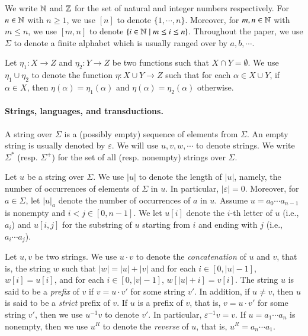 
We write $\mathbb{N}$ and $\mathbb{Z}$ for the set of natural and integer numbers respectively. For $n \in \mathbb{N}$ with $n \ge 1$, we use $[n]$ to denote $\{1, \cdots, n\}$. Moreover, for $m,n \in \mathbb{N}$ with $m \le n$, we use $[m, n]$ to denote $\{ i \in \mathbb{N} \mid m \le i \le n \}$. Throughout the paper, we use $\Sigma$ to denote a finite alphabet which is usually ranged over by $a,b,\cdots$.

Let $\eta_1: X \rightarrow Z$ and $\eta_2: Y \rightarrow Z$ be two functions such that $X \cap Y = \emptyset$. We use $\eta_1 \cup \eta_2$ to denote the function $\eta: X \cup Y \rightarrow Z$ such that for each $\alpha \in X \cup Y$, if $\alpha \in X$, then $\eta(\alpha) = \eta_1(\alpha)$ and $\eta(\alpha) = \eta_2(\alpha)$ otherwise. 

\paragraph*{Strings, languages, and transductions.}
A string over $\Sigma$ is a (possibly empty) sequence of elements from $\Sigma$. An empty string is usually denoted by $\varepsilon$. We will use $u, v, w, \cdots$ to denote strings. We write $\Sigma^*$ (resp. $\Sigma^+$) for the set of all (resp. nonempty) strings over $\Sigma$.

Let $u$ be a string over $\Sigma$. We use $|u|$ to denote the length of $|u|$, namely, the number of occurrences of elements of $\Sigma$ in $u$. In particular, $|\varepsilon|=0$. Moreover, for $a \in \Sigma$, let $|u|_a$ denote the number of occurrences of $a$ in $u$. 
Assume $u=a_0\cdots a_{n-1}$ is nonempty and $i<j \in [0,n-1]$. %
We let $u[i]$ denote the $i$-th letter of $u$ (i.e., $a_i$) and $u[i,j]$ for the substring of $u$ starting from $i$ and ending with $j$ (i.e., $a_i\cdots a_j$). 

Let $u, v$ be two strings. We use $u \cdot v$ to denote the \emph{concatenation} of $u$ and $v$, that is, the string $w$ such that $|w|= |u| + |v|$ and for each $i \in [0, |u|-1]$, $w[i]= u[i]$, and for each $i \in [0,|v|-1]$, $w[|u|+i]=v[i]$. The string $u$ is said to be a \emph{prefix} of $v$ if $v = u \cdot v'$ for some string $v'$.
In addition, if $u \neq v$, then $u$ is said to be a \emph{strict} prefix of $v$. If $u$ is a prefix of $v$, that is, $v = u \cdot v'$ for some string $v'$, then 
we use $u^{-1} v$ to denote $v'$. In particular, $\varepsilon^{-1} v = v$.
If $u=a_1 \cdots a_n$ is nonempty, then we use $u^R$ to denote the \emph{reverse} of $u$, that is, $u^R= a_n \cdots a_1$. 


